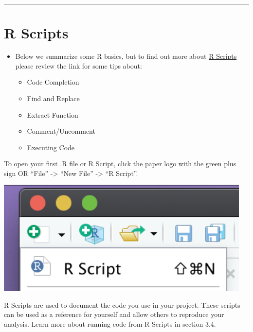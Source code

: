 \documentclass[
]{book}
\begin{document}
\begin{center}\rule{0.5\linewidth}{0.5pt}\end{center}

\hypertarget{r-scripts}{%
\section{R Scripts}\label{r-scripts}}

\begin{itemize}
\item
  Below we summarize some R basics, but to find out more about \href{https://support.rstudio.com/hc/en-us/articles/200484448-Editing-and-Executing-Code}{R Scripts} please review the link for some tips about:

  \begin{itemize}
  \item
    Code Completion
  \item
    Find and Replace
  \item
    Extract Function
  \item
    Comment/Uncomment
  \item
    Executing Code
  \end{itemize}
\end{itemize}

To open your first .R file or R Script, click the paper logo with the green plus sign OR ``File'' -\textgreater{} ``New File'' -\textgreater{} ``R Script''.

\begin{center}\includegraphics[width=5.03in]{img/Rscript} \end{center}

R Scripts are used to document the code you use in your project. These scripts can be used as a reference for yourself and allow others to reproduce your analysis. Learn more about running code from R Scripts in section 3.4.
\end{document}
